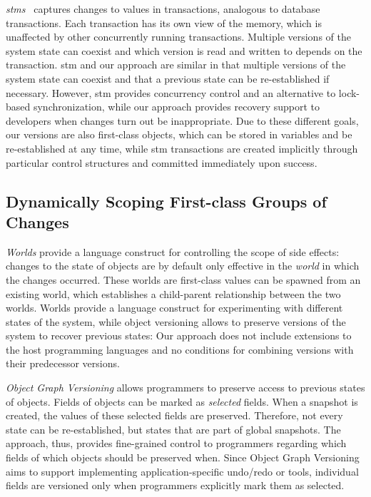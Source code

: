 \emph{\Acp{stm}}~\cite{Shavit1995STM} captures changes to values in transactions, analogous to database transactions.
Each transaction has its own view of the memory, which is unaffected by other concurrently running transactions.
Multiple versions of the system state can coexist and which version is read and written to depends on the transaction.
\ac{stm} and our approach are similar in that multiple versions of the system state can coexist and that a previous state can be re-established if necessary.
However, \ac{stm} provides concurrency control and an alternative to lock-based synchronization, while our approach provides recovery support to developers when changes turn out be inappropriate.
Due to these different goals, our versions are also first-class objects, which can be stored in variables and be re-established at any time, while \ac{stm} transactions are created implicitly through particular control structures and committed immediately upon success.

\subsection{Dynamically Scoping First-class Groups of Changes}

\emph{Worlds}\cite{Warth2011Wor} provide a language construct for controlling the scope of side effects: changes to the state of objects are by default only effective in the \emph{world} in which the changes occurred.
These worlds are first-class values can be spawned from an existing world, which establishes a child-parent relationship between the two worlds.
Worlds provide a language construct for experimenting with different states of the system, while object versioning allows to preserve versions of the system to recover previous states: Our approach does not include extensions to the host programming languages and no conditions for combining versions with their predecessor versions.

\emph{Object Graph Versioning}\cite{Pluquet2009ECP} allows programmers to preserve access to previous states of objects.
Fields of objects can be marked as \emph{selected} fields.
When a snapshot is created, the values of these selected fields are preserved.
Therefore, not every state can be re-established, but states that are part of global snapshots. 
The approach, thus, provides fine-grained control to programmers regarding which fields of which objects should be preserved when.
Since Object Graph Versioning aims to support implementing application-specific undo/redo or tools, individual fields are versioned only when programmers explicitly mark them as selected.


